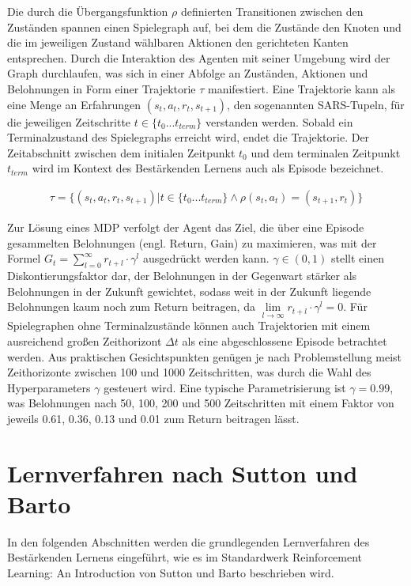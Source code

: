 Die durch die Übergangsfunktion $\rho$ definierten Transitionen zwischen den Zuständen
spannen einen Spielegraph auf, bei dem die Zustände den Knoten und die im jeweiligen
Zustand wählbaren Aktionen den gerichteten Kanten entsprechen. Durch die Interaktion
des Agenten mit seiner Umgebung wird der Graph durchlaufen, was sich in einer
Abfolge an Zuständen, Aktionen und Belohnungen in Form einer Trajektorie $\tau$
manifestiert. Eine Trajektorie kann als eine Menge an Erfahrungen
$(s_t, a_t, r_t, s_{t+1})$, den sogenannten SARS-Tupeln, für die jeweiligen
Zeitschritte $t \in \{ t_0 ... t_{term} \}$ verstanden werden.
Sobald ein Terminalzustand des Spielegraphs erreicht wird, endet die Trajektorie.
Der Zeitabschnitt zwischen dem initialen Zeitpunkt $t_0$ und dem terminalen Zeitpunkt
$t_{term}$ wird im Kontext des Bestärkenden Lernens auch als Episode bezeichnet.

\begin{equation}
\begin{aligned}
\tau = \{ (s_{t}, a_{t}, r_t, s_{t+1}) | t \in \{ t_0 ... t_{term} \}
\land \rho(s_t, a_t) = (s_{t+1}, r_t) \}
\end{aligned}
\end{equation}

Zur Lösung eines MDP verfolgt der Agent das Ziel, die über eine Episode gesammelten
Belohnungen (engl. Return, Gain) zu maximieren, was mit der Formel
$G_t = \sum_{l=0}^{\infty} r_{t+l} \cdot \gamma^l$ ausgedrückt werden kann.
$\gamma \in (0, 1)$ stellt einen Diskontierungsfaktor dar, der Belohnungen in
der Gegenwart stärker als Belohnungen in der Zukunft gewichtet, sodass weit in der
Zukunft liegende Belohnungen kaum noch zum Return beitragen, da
$\lim \limits_{l \to \infty} r_{t+l} \cdot \gamma^l = 0$.
Für Spielegraphen ohne Terminalzustände können auch Trajektorien mit einem ausreichend
großen Zeithorizont $\Delta t$ als eine abgeschlossene Episode betrachtet werden.
Aus praktischen Gesichtspunkten genügen je nach Problemstellung meist Zeithorizonte
zwischen 100 und 1000 Zeitschritten, was durch die Wahl des Hyperparameters $\gamma$
gesteuert wird. Eine typische Parametrisierung ist $\gamma = 0.99$, was Belohnungen
nach 50, 100, 200 und 500 Zeitschritten mit einem Faktor von jeweils 0.61, 0.36, 0.13
und 0.01 zum Return beitragen lässt.

\section{Lernverfahren nach Sutton und Barto}
In den folgenden Abschnitten werden die grundlegenden Lernverfahren des Bestärkenden
Lernens eingeführt, wie es im Standardwerk \glqq{}Reinforcement Learning: An Introduction\grqq{}
von Sutton und Barto \cite{sutton1998rlintro} beschrieben wird.

